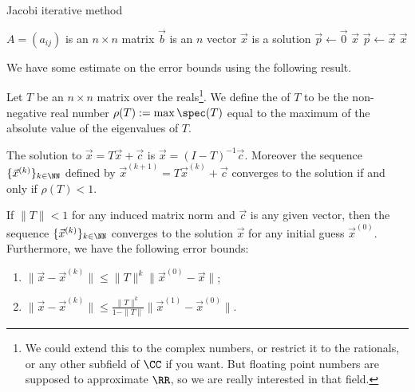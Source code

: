 \begin{algorithm}\label{alg:iterative-linear:jacobi-iterative}
  \caption{Jacobi iterative method}
  \begin{algorithmic}[1]
    \Require $A=(a_{ij})$ is an $n\times n$ matrix
    \Require $\vec{b}$ is an $n$ vector
    \Ensure $\vec{x}$ is a solution
    \State $\vec{p}\gets\vec{0}$ 
      \EndFor
        \State\Return $\vec{x}$
      \EndIf
      \State $\vec{p}\gets\vec{x}$
    \EndFor
    \State\Return $\vec{x}$
  \EndFunction
\end{algorithmic}
\end{algorithm}

We have some estimate on the error bounds using the following result.

\begin{defn}
Let $T$ be an $n\times n$ matrix over the reals\footnote{We could extend
this to the complex numbers, or restrict it to the rationals, or any
other subfield of $\CC$ if you want. But floating point numbers are
supposed to approximate $\RR$, so we are really interested in that field.}.
We define the  of $T$ to be the non-negative
real number $\rho(T) := \max\spec(T)$ equal to the maximum of the
absolute value of the eigenvalues of $T$.
\end{defn}

\begin{lemma}
The solution to $\vec{x}=T\vec{x}+\vec{c}$ is $\vec{x}=(I-T)^{-1}\vec{c}$.
Moreover the sequence $\{\vec{x}^{(k)}\}_{k\in\NN}$ defined by
$\vec{x}^{(k+1)}=T\vec{x}^{(k)}+\vec{c}$ converges to the solution if
and only if $\rho(T)<1$.
\end{lemma}

\begin{prop}
If $\|T\|<1$ for any induced matrix norm and $\vec{c}$ is any given
vector, then the sequence $\{\vec{x}^{(k)}\}_{k\in\NN}$ converges to the
solution $\vec{x}$ for any initial guess $\vec{x}^{(0)}$. Furthermore,
we have the following error bounds:
\begin{enumerate}
\item $\|\vec{x}-\vec{x}^{(k)}\|\leq\|T\|^{k}\|\vec{x}^{(0)}-\vec{x}\|$;
\item $\displaystyle\|\vec{x}-\vec{x}^{(k)}\|\leq\frac{\|T\|^{k}}{1-\|T\|}\|\vec{x}^{(1)}-\vec{x}^{(0)}\|$.
\end{enumerate}
\end{prop}

